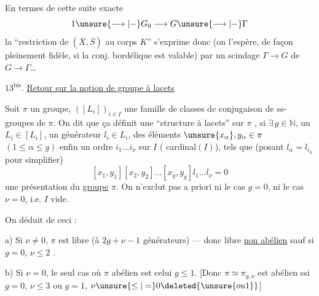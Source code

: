 

En termes de cette suite exacte
\[
1\unsure{\longrightarrow|-}G_0\longrightarrow G\unsure{\longrightarrow|-}\Gamma
\]
la ``restriction de $(\overline X,\overline S)$ au corps $K$'' s'exprime
donc (on l'espère, de façon pleinement fidèle,
si la conj. bordélique est valable) par
un scindage $\Gamma\to G$ de $G\to\Gamma$\dots

$13^{\mathrm{bis}}$. \uline{Retour sur la notion de groupe à lacets}

Soit $\pi$ un groupe, $([L_i])_{i\in I}$ une famille
de classes de conjugaison de ss-groupes de
$\pi$. On dit que ça définit une 
``structure à lacets'' sur $\pi$ \inserted{[de type $(g,\nu)$]}, si $\exists\,g\in\mathbb N$,
 un $L_i\in[L_i]$, un générateur
$l_i\in L_i$, des éléments $\unsure{x_\alpha},y_\alpha\in\pi$ $(1\le\alpha\le g)$
enfin un ordre $i_1\dots i_\nu$ sur $I$ ( \inserted{$\nu=$} cardinal$(I)$),
tels que (posant $l_\alpha=l_{i_\alpha}$ pour simplifier)
\[
[x_1,y_1][x_2,y_2]\dots[x_g,y_g]l_1\dots l_\nu=0
\]
 une présentation du \uline{groupe} $\pi$. On
n'exclut pas a priori ni le cas $g=0$, ni le cas $\nu=0$,
i.e. $I$ vide.

On déduit de ceci :

a) Si $\nu\ne0$, $\pi$ est libre (à $2g+\nu-1$ générateurs) ---
donc libre \uline{non abélien} sauf si $g=0$, $\nu\le2$ .



b) Si $\nu=0$, le seul cas où $\pi$ abélien est celui
$g\le1$. [Donc $\pi\simeq\pi_{g,\nu}$ est abélien ssi
$g=0$, $\nu\le3$ ou $g=1$, $\nu\unsure{\le|=}0\deleted{\unsure{ou 1}}$]

